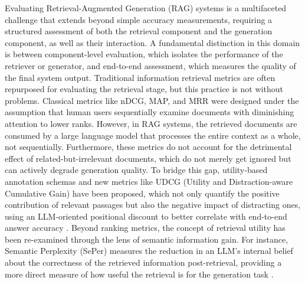 \documentclass[11pt]{article}
\begin{document}
Evaluating Retrieval-Augmented Generation (RAG) systems is a multifaceted challenge that extends beyond simple accuracy measurements, requiring a structured assessment of both the retrieval component and the generation component, as well as their interaction. A fundamental distinction in this domain is between component-level evaluation, which isolates the performance of the retriever or generator, and end-to-end assessment, which measures the quality of the final system output. Traditional information retrieval metrics are often repurposed for evaluating the retrieval stage, but this practice is not without problems. Classical metrics like nDCG, MAP, and MRR were designed under the assumption that human users sequentially examine documents with diminishing attention to lower ranks. However, in RAG systems, the retrieved documents are consumed by a large language model that processes the entire context as a whole, not sequentially. Furthermore, these metrics do not account for the detrimental effect of related-but-irrelevant documents, which do not merely get ignored but can actively degrade generation quality. To bridge this gap, utility-based annotation schemas and new metrics like UDCG (Utility and Distraction-aware Cumulative Gain) have been proposed, which not only quantify the positive contribution of relevant passages but also the negative impact of distracting ones, using an LLM-oriented positional discount to better correlate with end-to-end answer accuracy \cite{ref403}. Beyond ranking metrics, the concept of retrieval utility has been re-examined through the lens of semantic information gain. For instance, Semantic Perplexity (SePer) measures the reduction in an LLM's internal belief about the correctness of the retrieved information post-retrieval, providing a more direct measure of how useful the retrieval is for the generation task \cite{ref404}.
\end{document}
